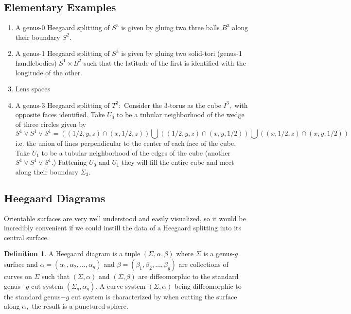 \documentclass{amsart}
\theoremstyle{definition}
\newtheorem{definition}[theorem]{Definition}
\begin{document}
\subsection{Elementary Examples}
\begin{enumerate}

\item A genus-0 Heegaard splitting of $S^{3}$ is given by gluing two three balls $B^{3}$ along their boundary $S^{2}.$
\item A genus-1 Heegaard splitting of $S^{3}$ is given by gluing two solid-tori (genus-1 handlebodies) $S^{1} \times B^{2}$ such that the latitude of the first is identified with the longitude of the other.
\item Lens spaces
\item A genus-3 Heegaard splitting of $T^{3}:$ Consider the 3-torus as the cube $I^{3},$ with opposite faces identified. Take $U_{0}$ to be a tubular neighborhood of the wedge of three circles given by $$S^{1}\vee S^{1} \vee S^{1} = ((1/2, y, z) \cap (x, 1/2, z)) \bigcup ((1/2, y, z) \cap (x, y, 1/2)) \bigcup ((x, 1/2, z) \cap (x, y, 1/2))$$ i.e. the union of lines perpendicular to the center of each face of the cube. Take $U_{1}$ to be a tubular neighborhood of the edges of the cube (another $S^{1} \vee S^{1} \vee S^{1}$.) Fattening $U_{0}$ and $U_{1}$ they will fill the entire cube and meet along their boundary $\Sigma_{3}.$ 
\end{enumerate}

\subsection{Heegaard Diagrams} 
Orientable surfaces are very well understood and easily visualized, so it would be incredibly convenient if we could instill the data of a Heegaard splitting into its central surface. 

\begin{definition}
A Heegaard diagram is a tuple $(\Sigma, \alpha, \beta)$ where $\Sigma$ is a genus-$g$ surface and $\alpha = (\alpha_{1}, \alpha_{2}, \hdots, \alpha_{g})$ and $\beta = (\beta_{1}, \beta_{2}, \hdots, \beta_{g})$ are collections of curves on $\Sigma$ such that $(\Sigma, \alpha)$ and $(\Sigma, \beta)$ are diffeomorphic to the standard genus$-g$ cut system $(\Sigma_{g}, \alpha_{g}).$ A curve system $(\Sigma, \alpha)$ being diffeomorphic to the standard genus$-g$ cut system is characterized by when cutting the surface along $\alpha,$ the result is a punctured sphere. 
\end{definition}
\end{document}

